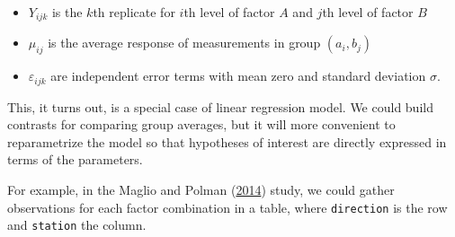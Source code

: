 \documentclass[
  11pt,
  letterpaper,
]{scrbook}
\providecommand{\tightlist}{%
  \setlength{\itemsep}{0pt}\setlength{\parskip}{0pt}}\usepackage{longtable,booktabs,array}
\theoremstyle{definition}
\theoremstyle{remark}
\begin{document}
\begin{itemize}
\tightlist
\item
  \(Y_{ijk}\) is the \(k\)th replicate for \(i\)th level of factor \(A\)
  and \(j\)th level of factor \(B\)
\item
  \(\mu_{ij}\) is the average response of measurements in group
  \((a_i, b_j)\)
\item
  \(\varepsilon_{ijk}\) are independent error terms with mean zero and
  standard deviation \(\sigma\).
\end{itemize}

This, it turns out, is a special case of linear regression model. We
could build contrasts for comparing group averages, but it will more
convenient to reparametrize the model so that hypotheses of interest are
directly expressed in terms of the parameters.

For example, in the Maglio and Polman
(\protect\hyperlink{ref-Maglio.Polman:2014}{2014}) study, we could
gather observations for each factor combination in a table, where
\texttt{direction} is the row and \texttt{station} the column.
\end{document}
